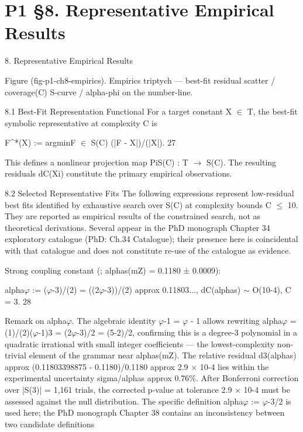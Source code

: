 
\section{P1 §8. Representative Empirical Results}

8. Representative Empirical Results

   Figure (fig-p1-ch8-empirics). Empirics triptych --- best-fit residual scatter / coverage(C) S-curve /
                                    alpha-phi on the number-line.

  8.1 Best-Fit Representation Functional
  For a target constant X $\in$ T, the best-fit symbolic representative at complexity C is

  F^*(X) := argminF $\in$ S(C) (|F - X|)/(|X|). 27

  This defines a nonlinear projection map PiS(C) : T $\rightarrow$ S(C). The resulting residuals
  {dC(Xi)} constitute the primary empirical observations.

  8.2 Selected Representative Fits
  The following expressions represent low-residual best fits identified by exhaustive
  search over S(C) at complexity bounds C $\leq$ 10. They are reported as empirical results of
  the constrained search, not as theoretical derivations. Several appear in the PhD
  monograph Chapter 34 exploratory catalogue (PhD: Ch.34 Catalogue); their presence
  here is coincidental with that catalogue and does not constitute re-use of the catalogue
  as evidence.

  Strong coupling constant (\citealp{pdg2024}; alphas(mZ) = 0.1180 ± 0.0009):

  alpha$\varphi$ := ($\varphi$-3)/(2) = ((2$\varphi$-3))/(2) approx 0.11803..., dC(alphas) $\sim$ O(10-4), C = 3. 28

  Remark on alpha$\varphi$. The algebraic identity $\varphi$-1 = $\varphi$ - 1 allows rewriting alpha$\varphi$ =
  (1)/(2)($\varphi$-1)3 = (2$\varphi$-3)/2 = (5-2)/2, confirming this is a degree-3 polynomial in a
  quadratic irrational with small integer coefficients --- the lowest-complexity non-trivial
  element of the grammar near alphas(mZ). The relative residual d3(alphas) approx
  (0.11803398875 - 0.1180)/0.1180 approx 2.9 $\times$ 10-4 lies within the experimental
  uncertainty sigma/alphas approx 0.76\%. After Bonferroni correction over |S(3)| =
  1{,}161 trials, the corrected p-value at tolerance 2.9 $\times$ 10-4 must be assessed against
  the null distribution. The specific definition alpha$\varphi$ := $\varphi$-3/2 is used here; the PhD
  monograph Chapter 38 contains an inconsistency between two candidate definitions

